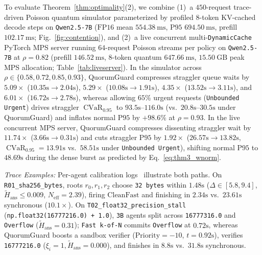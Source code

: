 \documentclass[conference]{IEEEtran}
\def\QG{QuorumGuard}%
\theoremstyle{definition}
\theoremstyle{remark}
\newcommand{\QG}{\textsc{QuorumGuard}}
\newcommand{\Neff}{N_{\mathrm{eff}}}
\newcommand{\Htilde}{\tilde{H}_{\mathrm{ans}}}
\newcommand{\CVaR}{\operatorname{CVaR}}
\begin{document}
To evaluate Theorem~\ref{thm:optimality}(2), we combine (1)~a $450$-request trace-driven Poisson quantum simulator parameterized by profiled 8-token KV-cached decode steps on \texttt{Qwen2.5-7B} ($\mathrm{FP16}$ mean $554.38~\mathrm{ms}$, $\mathrm{P95}$ $694.50~\mathrm{ms}$, prefill $102.17~\mathrm{ms}$; Fig.~\ref{fig:contention}), and (2)~a live concurrent multi-\texttt{DynamicCache} PyTorch MPS server running $64$-request Poisson streams per policy on \texttt{Qwen2.5-7B} at $\rho = 0.82$ (prefill $146.52~\mathrm{ms}$, 8-token quantum $647.66~\mathrm{ms}$, $15.50~\mathrm{GB}$ peak MPS allocation; Table~\ref{tab:liveserver}). In the simulator across $\rho \in \{0.58, 0.72, 0.85, 0.93\}$, \QG{} compresses straggler queue waits by $5.09\times$ ($10.35\text{s} \to 2.04\text{s}$), $5.29\times$ ($10.08\text{s} \to 1.91\text{s}$), $4.35\times$ ($13.52\text{s} \to 3.11\text{s}$), and $6.01\times$ ($16.72\text{s} \to 2.78\text{s}$), whereas allowing $65\%$ urgent requests (\texttt{Unbounded Urgent}) drives straggler $\CVaR_{0.95}$ to $93.5\text{s}$--$116.0\text{s}$ (vs.\ $20.8\text{s}$--$30.5\text{s}$ under \QG{}) and inflates normal $\mathrm{P95}$ by $+98.6\%$ at $\rho = 0.93$. In the live concurrent MPS server, \QG{} compresses dissenting straggler wait by $11.74\times$ ($3.66\text{s} \to 0.31\text{s}$) and cuts straggler $\mathrm{P95}$ by $1.92\times$ ($26.57\text{s} \to 13.82\text{s}$, $\CVaR_{0.95} = 13.91\text{s}$ vs.\ $58.51\text{s}$ under \texttt{Unbounded Urgent}), shifting normal $\mathrm{P95}$ to $48.69\text{s}$ during the dense burst as predicted by Eq.~\eqref{eq:thm3_wnorm}.

\emph{Trace Examples:} Per-agent calibration logs~\cite{kadavath2022know,guo2017calibration,boland1989majority} illustrate both paths. On \texttt{R01\_sha256\_bytes}, roots $r_0, r_1, r_2$ choose \texttt{32 bytes} within $1.48\text{s}$ ($\Delta \in [5.8, 9.4]$, $\Htilde \le 0.009$, $\Neff = 2.39$), firing $\mathrm{CleanFast}$ and finishing in $2.34\text{s}$ vs.\ $23.61\text{s}$ synchronous ($10.1\times$). On \texttt{T02\_float32\_precision\_stall} (\texttt{np.float32(16777216.0) + 1.0}), \texttt{3B} agents split across \texttt{16777316.0} and \texttt{Overflow} ($\Htilde = 0.31$); \texttt{Fast k-of-N} commits \texttt{Overflow} at $0.72\text{s}$, whereas \QG{} boosts a sandbox verifier ($\mathrm{Priority} = -10$, $t = 0.92\text{s}$), verifies \texttt{16777216.0} ($\xi_i = 1, \Htilde = 0.000$), and finishes in $8.8\text{s}$ vs.\ $31.8\text{s}$ synchronous.

\end{document}
